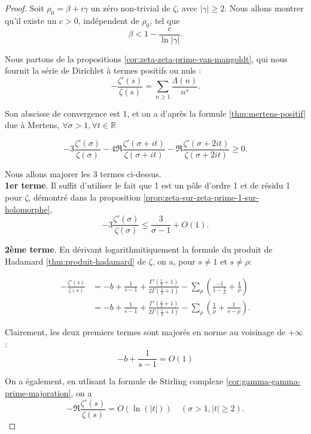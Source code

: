 \documentclass[french]{report}
\begin{document}
\begin{proof}
  Soit $\rho_0=\beta+i\gamma$ un zéro non-trivial de $\zeta$, avec $|\gamma|\geq2$. Nous allons montrer qu'il existe un $c>0$, indépendent de $\rho_0$, tel que 
  \[ \beta<1-\frac{c}{\ln|\gamma|}. \]

  Nous partons de la propositions \ref{cor:zeta-zeta-prime-van-mangoldt}, qui nous fournit la série de Dirichlet à termes positifs ou nuls :
  \[ -\frac{\zeta'(s)}{\zeta(s)} = \sum_{n\geq1}\frac{\Lambda(n)}{n^s}. \]

  Son abscisse de convergence est $1$, et on a d'après la formule \ref{thm:mertens-positif} due à Mertens, $\forall\sigma>1, \forall t\in\mathbb{R}$

 \begin{equation}\label{eq:mertens-zeta-zeta-prime}
  - 3\frac{\zeta'(\sigma)}{\zeta(\sigma)}
  - 4\Re\frac{\zeta'(\sigma+it)}{\zeta(\sigma+it)}
  - \Re\frac{\zeta'(\sigma+2it)}{\zeta(\sigma+2it)}
  \geq0.
 \end{equation}

  Nous allons majorer les 3 termes ci-dessus.
  \\

  \textbf{1er terme}. Il suffit d'utiliser le fait que 1 est un pôle d'ordre 1 et de résidu 1 pour $\zeta$, démontré dans la  proposition \ref{prop:zeta-sur-zeta-prime-1-sur-holomorphe},
  \[ -3\frac{\zeta'(\sigma)}{\zeta(\sigma)} \leq \frac{3}{\sigma-1} + O(1). \]

  \textbf{2ème terme}. En dérivant logarithmitiquement la formule du produit de Hadamard \ref{thm:produit-hadamard} de $\zeta$, on a, pour $s\neq1$ et $s\neq\rho$:

  \begin{align}
    -\frac{\zeta'(s)}{\zeta(s)}
    &= -b + \frac{1}{s-1}
    + \frac{\Gamma'(\frac{s}{2}+1)}{2\Gamma(\frac{s}{2}+1)}
    - \sum_{\rho}\left(\frac{-1}{1-\frac{s}{\rho}} + \frac{1}{\rho}\right) \\
    &= -b + \frac{1}{s-1}
    + \frac{\Gamma'(\frac{s}{2}+1)}{2\Gamma(\frac{s}{2}+1)}
    - \sum_{\rho}\left(\frac{1}{\rho} + \frac{1}{s-\rho} \right). \label{eq:hadamard-derivee-logarithmique}
  \end{align}

  Clairement, les deux premiers termes sont majorés en norme au voisinage de $+\infty$ :
  \[ -b + \frac{1}{s-1} = O(1) \]

  On a également, en utlisant la formule de Stirling complexe \ref{cor:gamma-gamma-prime-majoration}, on a
  \[ -\Re\frac{\zeta'(s)}{\zeta(s)} = O(\ln(|t|))\quad(\sigma>1, |t|\geq2). \]


\end{proof}
\end{document}
